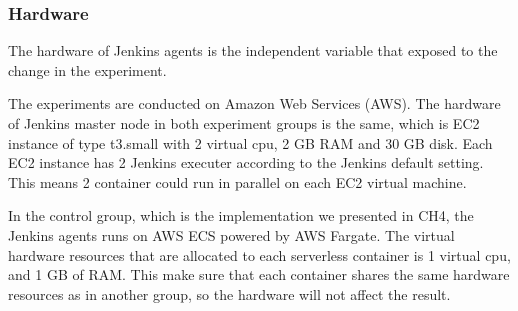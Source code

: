 \subsubsection{Hardware}
The hardware of Jenkins agents is the independent variable that exposed to the change in the experiment.
\par
The experiments are conducted on Amazon Web Services (AWS). The hardware of Jenkins master node in both experiment groups is the same, which is EC2 instance of type t3.small with 2 virtual cpu, 2 GB RAM and 30 GB disk. Each EC2 instance has 2 Jenkins executer according to the Jenkins default setting. This means 2 container could run in parallel on each EC2 virtual machine.
\par
In the control group, which is the implementation we presented in CH4, the Jenkins agents runs on AWS ECS powered by AWS Fargate. The virtual hardware resources that are allocated to each serverless container is 1 virtual cpu, and 1 GB of RAM. This make sure that each container shares the same hardware resources as in another group, so the hardware will not affect the result.
